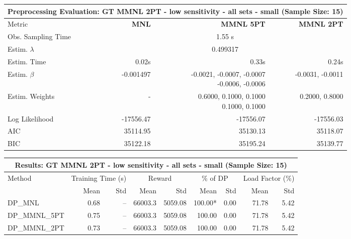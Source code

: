 
\begin{samepage}
\begin{center}
  \small
  \begin{tabular}{l|r|r|r}
    \toprule
    \multicolumn{4}{c}{\textbf{Preprocessing Evaluation: GT MMNL 2PT - low sensitivity - all sets - small (Sample Size: 15)}} \\
    \midrule
    Metric & \textbf{MNL} & \textbf{MMNL 5PT} & \textbf{MMNL 2PT} \\
    \midrule
    Obs. Sampling Time & \multicolumn{3}{c}{1.55 s} \\
    Estim. $\lambda$ & \multicolumn{3}{c}{0.499317} \\
    Estim. Time & 0.02s & 0.33s & 0.24s \\
    Estim. $\beta$ & -0.001497 & \makecell[tr]{-0.0021, -0.0007, -0.0007 \\ -0.0006, -0.0006} & -0.0031, -0.0011 \\
    Estim. Weights & - & \makecell[tr]{0.6000, 0.1000, 0.1000 \\ 0.1000, 0.1000} & 0.2000, 0.8000 \\
    Log Likelihood & -17556.47 & -17556.07 & -17556.03 \\
    AIC & 35114.95 & 35130.13 & 35118.07 \\
    BIC & 35122.18 & 35195.24 & 35139.77 \\
    \bottomrule
  \end{tabular}
\end{center}
\begin{center}
  \small
  \begin{tabular}{l|rr|rr|rr|rr}
    \toprule
    \multicolumn{9}{c}{\textbf{Results: GT MMNL 2PT - low sensitivity - all sets - small (Sample Size: 15)}} \\
    \midrule
    Method & \multicolumn{2}{c|}{Training Time (s)} & \multicolumn{2}{c|}{Reward} & \multicolumn{2}{c|}{\% of DP} & \multicolumn{2}{c}{Load Factor (\%)} \\
    & Mean & Std & Mean & Std & Mean & Std & Mean & Std \\
    \midrule
    DP\_MNL      &     0.68 &    -- &    66003.3 &    5059.08 & 100.00* &    0.00 &   71.78 &    5.42 \\
    DP\_MMNL\_5PT &     0.75 &    -- &    66003.3 &    5059.08 &  100.00 &    0.00 &   71.78 &    5.42 \\
    DP\_MMNL\_2PT &     0.73 &    -- &    66003.3 &    5059.08 &  100.00 &    0.00 &   71.78 &    5.42 \\

\end{tabular}
\end{center}
\end{samepage}
